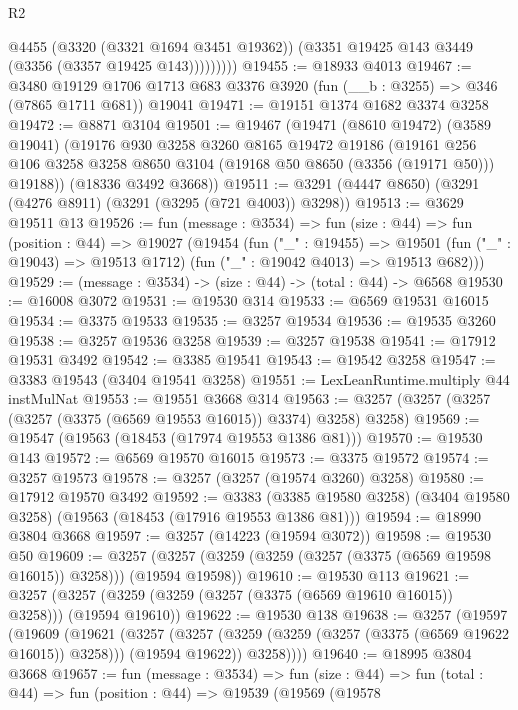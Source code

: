 \begin{lexlean}{R2}
\begin{coremodule}
                @4455
                (@3320 (@3321 @1694 @3451 @19362))
                (@3351 @19425 @143 @3449 (@3356 (@3357 @19425 @143)))))))))
@19455 := @18933 @4013
@19467 := @3480
    @19129
    @1706
    @1713
    @683
    @3376
    @3920
    (fun (__b : @3255) => @346 (@7865 @1711 @681))
    @19041
@19471 := @19151 @1374 @1682 @3374 @3258
@19472 := @8871 @3104
@19501 := @19467
    (@19471
      (@8610 @19472)
      (@3589 @19041)
      (@19176
        @930
        @3258
        @3260
        @8165
        @19472
        @19186
        (@19161 @256 @106 @3258 @3258 @8650 @3104 (@19168 @50 @8650 (@3356 (@19171 @50))) @19188))
      (@18336 @3492 @3668))
@19511 := @3291 (@4447 @8650) (@3291 (@4276 @8911) (@3291 (@3295 (@721 @4003)) @3298))
@19513 := @3629 @19511 @13
@19526 := fun (message : @3534) =>
  fun (size : @44) =>
  fun (position : @44) =>
  @19027
    (@19454
      (fun ("_" : @19455) =>
      @19501 (fun ("_" : @19043) => @19513 @1712) (fun ("_" : @19042 @4013) => @19513 @682)))
@19529 := (message : @3534) -> (size : @44) -> (total : @44) -> @6568
@19530 := @16008 @3072
@19531 := @19530 @314
@19533 := @6569 @19531 @16015
@19534 := @3375 @19533
@19535 := @3257 @19534
@19536 := @19535 @3260
@19538 := @3257 @19536 @3258
@19539 := @3257 @19538
@19541 := @17912 @19531 @3492
@19542 := @3385 @19541
@19543 := @19542 @3258
@19547 := @3383 @19543 (@3404 @19541 @3258)
@19551 := LexLeanRuntime.multiply @44 instMulNat
@19553 := @19551 @3668 @314
@19563 := @3257 (@3257 (@3257 (@3257 (@3375 (@6569 @19553 @16015)) @3374) @3258) @3258)
@19569 := @19547 (@19563 (@18453 (@17974 @19553 @1386 @81)))
@19570 := @19530 @143
@19572 := @6569 @19570 @16015
@19573 := @3375 @19572
@19574 := @3257 @19573
@19578 := @3257 (@3257 (@19574 @3260) @3258)
@19580 := @17912 @19570 @3492
@19592 := @3383
    (@3385 @19580 @3258)
    (@3404 @19580 @3258)
    (@19563 (@18453 (@17916 @19553 @1386 @81)))
@19594 := @18990 @3804 @3668
@19597 := @3257 (@14223 (@19594 @3072))
@19598 := @19530 @50
@19609 := @3257 (@3257 (@3259 (@3259 (@3257 (@3375 (@6569 @19598 @16015)) @3258))) (@19594 @19598))
@19610 := @19530 @113
@19621 := @3257 (@3257 (@3259 (@3259 (@3257 (@3375 (@6569 @19610 @16015)) @3258))) (@19594 @19610))
@19622 := @19530 @138
@19638 := @3257
    (@19597
      (@19609
        (@19621
          (@3257
            (@3257 (@3259 (@3259 (@3257 (@3375 (@6569 @19622 @16015)) @3258))) (@19594 @19622))
            @3258))))
@19640 := @18995 @3804 @3668
@19657 := fun (message : @3534) =>
  fun (size : @44) =>
  fun (total : @44) =>
  fun (position : @44) =>
  @19539
    (@19569
      (@19578

\end{coremodule}
\end{lexlean}
